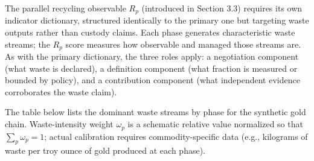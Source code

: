 \documentclass[12pt]{article}
\begin{document}
The parallel recycling observable \(R_p\) (introduced in Section 3.3)
requires its own indicator dictionary, structured identically to the
primary one but targeting waste outputs rather than custody claims. Each
phase generates characteristic waste streams; the \(R_p\) score measures
how observable and managed those streams are. As with the primary
dictionary, the three roles apply: a negotiation component (what waste
is declared), a definition component (what fraction is measured or
bounded by policy), and a contribution component (what independent
evidence corroborates the waste claim).

The table below lists the dominant waste streams by phase for the
synthetic gold chain. Waste-intensity weight \(\omega_p\) is a schematic
relative value normalized so that \(\sum_p \omega_p = 1\); actual
calibration requires commodity-specific data (e.g., kilograms of waste
per troy ounce of gold produced at each phase).
\end{document}
